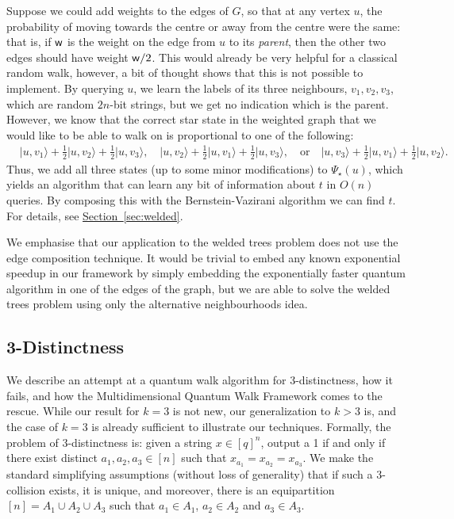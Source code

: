 \documentclass{theoretics}
\renewcommand{\sec}[1]{\hyperref[sec:#1]{Section~\ref*{sec:#1}}}
\def\ket#1{{\lvert}#1\rangle}
\renewcommand{\>}{\rangle}
\newcommand{\<}{\langle}
\renewcommand{\(}{\left(}
\renewcommand{\)}{\right)}
\def\w{{\sf w}}
\begin{document}
Suppose we could add weights to the edges of $G$, so that at any vertex $u$, the probability of moving towards the centre or away from the centre were the same: that is, if $\w$ is the weight on the edge from $u$ to its \emph{parent}, then the other two edges should have weight $\w/2$. This would already be very helpful for a classical random walk, however, a bit of thought shows that this is not possible to implement. By querying $u$, we learn the labels of its three neighbours, $v_1,v_2,v_3$,  which are random $2n$-bit strings, but we get no indication which is the parent. However, we know that the correct star state in the weighted graph that we would like to be able to walk on is proportional to one of the following:
\begin{align*}
&\ket{u,v_1}+\frac{1}{2}\ket{u,v_2}+\frac{1}{2}\ket{u,v_3},
\quad
\ket{u,v_2}+\frac{1}{2}\ket{u,v_1}+\frac{1}{2}\ket{u,v_3},
\quad\mbox{or}\quad
\ket{u,v_3}+\frac{1}{2}\ket{u,v_1}+\frac{1}{2}\ket{u,v_2}.
\end{align*}
Thus, we add all three states (up to some minor modifications) to $\Psi_\star(u)$, which yields an algorithm that can learn any bit of information about $t$ in $O(n)$ queries. By composing this with the Bernstein-Vazirani algorithm we can find $t$. For details, see \sec{welded}. 

We emphasise that our application to the welded trees problem does not use the edge composition technique. It would be trivial to embed any known exponential speedup in our framework by simply embedding the exponentially faster quantum algorithm in one of the edges of the graph, but we are able to solve the welded trees problem using only the alternative neighbourhoods idea. 


\subsection{3-Distinctness}\label{sec:intro-3-dist}

We describe an attempt at a quantum walk algorithm for 3-distinctness, how it fails, and how the Multidimensional Quantum Walk Framework comes to the rescue. While our result for $k=3$ is not new, our generalization to $k>3$ is, and the case of $k=3$ is already sufficient to illustrate our techniques. 
Formally, the problem of 3-distinctness is: given a string $x\in [q]^n$, output a 1 if and only if there exist distinct $a_1,a_2,a_3\in [n]$ such that $x_{a_1}=x_{a_2}=x_{a_3}$. We make the standard simplifying assumptions (without loss of generality) that if such a 3-collision exists, it is unique, and moreover, there is an equipartition $[n]=A_1\cup A_2\cup A_3$ such that $a_1\in A_1$, $a_2\in A_2$ and $a_3\in A_3$. 
\end{document}
